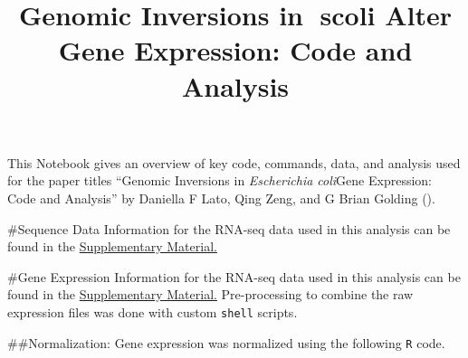\documentclass[
]{article}
\title{Genomic Inversions in scoli Alter Gene Expression: Code and Analysis}
\author{}
\date{\vspace{-2.5em}}
\begin{document}
\maketitle

\newcommand{\ecol}{\textit{E.\,coli}\xspace}
\newcommand{\escoli}{\textit{Escherichia coli}\xspace}

This Notebook gives an overview of key code, commands, data, and
analysis used for the paper titles ``Genomic Inversions in
\textit{Escherichia coli}\xspaceAlter Gene Expression: Code and
Analysis'' by Daniella F Lato, Qing Zeng, and G Brian Golding
().

\#Sequence Data Information for the RNA-seq data used in this analysis
can be found in the
\href{run:./Supplementary_Material_Lato_Zeng_Golding_GenomicInversionsInEcoli.pdf}{Supplementary Material.}

\#Gene Expression Information for the RNA-seq data used in this analysis
can be found in the
\href{run:./Supplementary_Material_Lato_Zeng_Golding_GenomicInversionsInEcoli.pdf}{Supplementary Material.}
Pre-processing to combine the raw expression files was done with custom
\texttt{shell} scripts.

\#\#Normalization: Gene expression was normalized using the following
\texttt{R} code.
\end{document}
